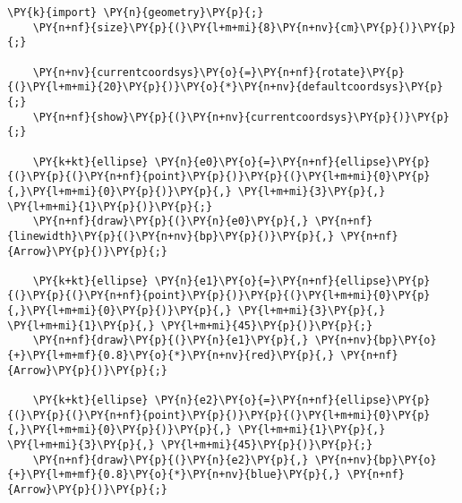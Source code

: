 \begin{Verbatim}[commandchars=\\\{\}]
    \PY{k}{import} \PY{n}{geometry}\PY{p}{;}
    \PY{n+nf}{size}\PY{p}{(}\PY{l+m+mi}{8}\PY{n+nv}{cm}\PY{p}{)}\PY{p}{;}

    \PY{n+nv}{currentcoordsys}\PY{o}{=}\PY{n+nf}{rotate}\PY{p}{(}\PY{l+m+mi}{20}\PY{p}{)}\PY{o}{*}\PY{n+nv}{defaultcoordsys}\PY{p}{;}
    \PY{n+nf}{show}\PY{p}{(}\PY{n+nv}{currentcoordsys}\PY{p}{)}\PY{p}{;}

    \PY{k+kt}{ellipse} \PY{n}{e0}\PY{o}{=}\PY{n+nf}{ellipse}\PY{p}{(}\PY{p}{(}\PY{n+nf}{point}\PY{p}{)}\PY{p}{(}\PY{l+m+mi}{0}\PY{p}{,}\PY{l+m+mi}{0}\PY{p}{)}\PY{p}{,} \PY{l+m+mi}{3}\PY{p}{,} \PY{l+m+mi}{1}\PY{p}{)}\PY{p}{;}
    \PY{n+nf}{draw}\PY{p}{(}\PY{n}{e0}\PY{p}{,} \PY{n+nf}{linewidth}\PY{p}{(}\PY{n+nv}{bp}\PY{p}{)}\PY{p}{,} \PY{n+nf}{Arrow}\PY{p}{)}\PY{p}{;}

    \PY{k+kt}{ellipse} \PY{n}{e1}\PY{o}{=}\PY{n+nf}{ellipse}\PY{p}{(}\PY{p}{(}\PY{n+nf}{point}\PY{p}{)}\PY{p}{(}\PY{l+m+mi}{0}\PY{p}{,}\PY{l+m+mi}{0}\PY{p}{)}\PY{p}{,} \PY{l+m+mi}{3}\PY{p}{,} \PY{l+m+mi}{1}\PY{p}{,} \PY{l+m+mi}{45}\PY{p}{)}\PY{p}{;}
    \PY{n+nf}{draw}\PY{p}{(}\PY{n}{e1}\PY{p}{,} \PY{n+nv}{bp}\PY{o}{+}\PY{l+m+mf}{0.8}\PY{o}{*}\PY{n+nv}{red}\PY{p}{,} \PY{n+nf}{Arrow}\PY{p}{)}\PY{p}{;}

    \PY{k+kt}{ellipse} \PY{n}{e2}\PY{o}{=}\PY{n+nf}{ellipse}\PY{p}{(}\PY{p}{(}\PY{n+nf}{point}\PY{p}{)}\PY{p}{(}\PY{l+m+mi}{0}\PY{p}{,}\PY{l+m+mi}{0}\PY{p}{)}\PY{p}{,} \PY{l+m+mi}{1}\PY{p}{,} \PY{l+m+mi}{3}\PY{p}{,} \PY{l+m+mi}{45}\PY{p}{)}\PY{p}{;}
    \PY{n+nf}{draw}\PY{p}{(}\PY{n}{e2}\PY{p}{,} \PY{n+nv}{bp}\PY{o}{+}\PY{l+m+mf}{0.8}\PY{o}{*}\PY{n+nv}{blue}\PY{p}{,} \PY{n+nf}{Arrow}\PY{p}{)}\PY{p}{;}
\end{Verbatim}

